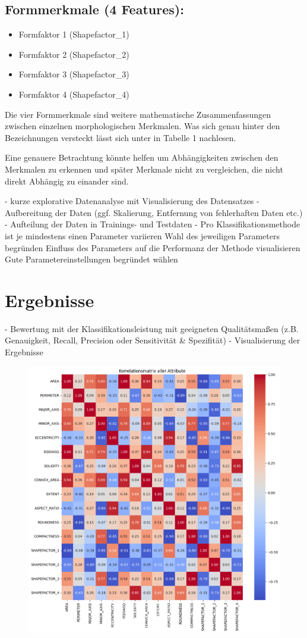 \subsection*{Formmerkmale (4 Features):}
\begin{itemize}
	\item Formfaktor 1 (Shapefactor\_1)
	\item Formfaktor 2 (Shapefactor\_2)
	\item Formfaktor 3 (Shapefactor\_3)
	\item Formfaktor 4 (Shapefactor\_4)
\end{itemize}

Die vier Formmerkmale sind weitere mathematische Zusammenfassungen zwischen einzelnen morphologischen Merkmalen.
Was sich genau hinter den Bezeichnungen versteckt lässt sich unter \parencite[4]{Ozkan.2021} in Tabelle 1 nachlesen.

Eine genauere Betrachtung könnte helfen um Abhängigkeiten zwischen den Merkmalen zu erkennen und später Merkmale nicht zu vergleichen, die nicht direkt Abhängig zu einander sind.

- kurze explorative Datenanalyse mit Visualisierung des Datensatzes
- Aufbereitung der Daten (ggf. Skalierung, Entfernung von fehlerhaften Daten etc.)
- Aufteilung der Daten in Trainings- und Testdaten
- Pro Klassifikationsmethode ist je mindestens einen Parameter variieren
	Wahl des jeweiligen Parameters begründen
	Einfluss des Parameters auf die Performanz der Methode visualisieren
	Gute Parametereinstellungen begründet wählen
	


\section{Ergebnisse}

- Bewertung mit der Klassifikationsleistung mit geeigneten Qualitätsmaßen (z.B. Genauigkeit, Recall, Precision oder Sensitivität \& Spezifität)
- Visualisierung der Ergebnisse

\begin{figure}
	\centering
	\includegraphics[width=\columnwidth]{images/korrelationsmatrix_aller_attribute}
	\caption{}
	\label{fig:korrelationsmatrixallerattribute}
\end{figure}

